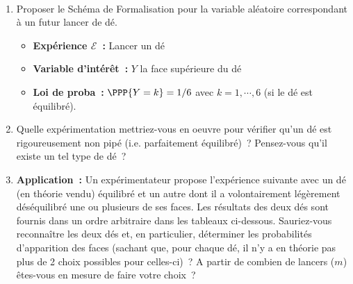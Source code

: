\documentclass[10pt]{report}
\begin{document}
\begin{exercice}[Lancer d'un dé] ${ }$\label{ex:des}

\begin{enumerate}
\item Proposer le Schéma de Formalisation pour la variable aléatoire correspondant à un futur lancer de dé.\\
\begin{Correction}
\begin{itemize}
\item \textbf{Expérience $\mathcal{E}$~:} Lancer un dé
\item \textbf{Variable d'intérêt~:} $Y$ la face supérieure du dé
\item \textbf{Loi de proba~:} $\PPP{Y=k}=1/6$ avec $k=1,\cdots,6$ (si le dé est équilibré).
\end{itemize}
\end{Correction} 

\item Quelle expérimentation mettriez-vous en oeuvre pour vérifier qu'un dé est rigoureusement non pipé (i.e. parfaitement équilibré)~? Pensez-vous qu'il existe un tel type de dé~?

\item \textbf{Application~:} Un expérimentateur propose l'expérience suivante avec un dé (en théorie vendu) équilibré et un autre dont il a volontairement légèrement déséquilibré une ou plusieurs de ses faces. Les résultats des deux dés sont fournis dans un ordre arbitraire dans les tableaux ci-dessous. Sauriez-vous reconnaître les deux dés et, en particulier, déterminer les probabilités d'apparition des faces (sachant que, pour chaque dé, il n'y a en théorie pas plus de 2 choix possibles pour celles-ci)~? A partir de combien de lancers ($m$) êtes-vous en mesure de faire votre choix~?


\end{enumerate}
\end{exercice}
\end{document}
